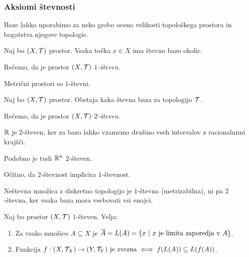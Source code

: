 \subsubsection{Aksiomi števnosti}

Baze lahko uporabimo za neko grobo oceno velikosti topološkega prostora in bogatstva njegove topologie.

\begin{definicija}
    Naj bo $(X, \mathcal{T})$ prostor. Vsaka točka $x \in X$ ima števno bazo okolic.

    Rečemo, da je prostor $(X, \mathcal{T})$ \emph{$1$-števen}. 
\end{definicija}

\begin{primer}
    Metrični prostori so $1$-števni.
\end{primer}

\begin{definicija}
    Naj bo $(X, \mathcal{T})$ prostor. Obstaja kaka števna baza za topologijo $\mathcal{T}$.

    Rečemo, da je prostor $(X, \mathcal{T})$ \emph{$2$-števen}. 
\end{definicija}

\begin{primer}
    $\mathbb{R}$ je $2$-števen, ker za bazo lahko vzamemo družino vseh intervalov z racionalnimi krajšči. 
    
    Podobno je tudi $\mathbb{R}^n$ $2$-števen.
\end{primer}

\begin{opomba}
    Očitno, da $2$-števnost implicira $1$-števnost.
\end{opomba}

\begin{primer}
    Neštevna množica z diskretno topologijo je $1$-števna (metrizabilna), ni pa $2$-števna, ker vsaka baza mora vsebovati vsi enojci.
\end{primer}

\begin{trditev}
    Naj bo prostor $(X, \mathcal{T})$ $1$-števen. Velja:
    \begin{enumerate}
        \item Za vsako množico $A \subseteq X$ je $\overline{A} = L(A) = \left\{x \ | \ x \text{ je limita zaporedja v } A\right\}$.
        \item Funkcija $f: (X, \mathcal{T}_X) \to (Y, \mathcal{T}_Y) \text{ je zvezna} \iff f(L(A)) \subseteq L(f(A))$.
    \end{enumerate}
\end{trditev}


